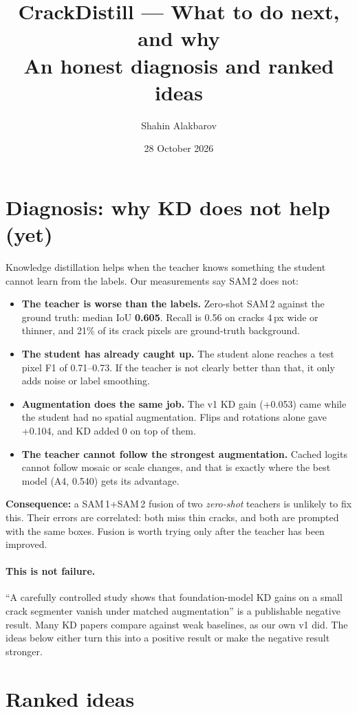 \documentclass[11pt,a4paper]{article}
\title{\textbf{CrackDistill --- What to do next, and why}\\\large An honest diagnosis and ranked ideas}
\author{Shahin Alakbarov}\date{28 October 2026}
\begin{document}
\maketitle

\section{Diagnosis: why KD does not help (yet)}
Knowledge distillation helps when the teacher knows something the student cannot learn from the labels.
Our measurements say SAM\,2 does not:
\begin{itemize}
\item \textbf{The teacher is worse than the labels.} Zero-shot SAM\,2 against the ground truth: median IoU \textbf{0.605}. Recall is 0.56 on cracks 4\,px wide or thinner, and 21\% of its crack pixels are ground-truth background.
\item \textbf{The student has already caught up.} The student alone reaches a test pixel F1 of 0.71--0.73. If the teacher is not clearly better than that, it only adds noise or label smoothing.
\item \textbf{Augmentation does the same job.} The v1 KD gain (+0.053) came while the student had no spatial augmentation. Flips and rotations alone gave +0.104, and KD added 0 on top of them.
\item \textbf{The teacher cannot follow the strongest augmentation.} Cached logits cannot follow mosaic or scale changes, and that is exactly where the best model (A4, 0.540) gets its advantage.
\end{itemize}
\textbf{Consequence:} a SAM\,1+SAM\,2 fusion of two \emph{zero-shot} teachers is unlikely to fix this. Their errors are
correlated: both miss thin cracks, and both are prompted with the same boxes. Fusion is worth trying only after the teacher has been improved.

\paragraph{This is not failure.} ``A carefully controlled study shows that foundation-model KD gains on a
small crack segmenter vanish under matched augmentation'' is a publishable negative result. Many KD papers compare
against weak baselines, as our own v1 did. The ideas below either turn this into a positive result or make the
negative result stronger.

\section{Ranked ideas}
\end{document}

